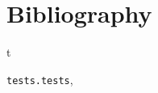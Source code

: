 \documentclass[letterpaper,10pt,english]{sphinxmanual}
\begin{document}
\chapter{Bibliography}
\label{index:bibliography}
\begin{thebibliography}{kanji98}
\end{thebibliography}


\renewcommand{\indexname}{Python Module Index}
\begin{theindex}
\def\bigletter#1{{\Large\sffamily#1}\nopagebreak\vspace{1mm}}
\bigletter{t}
\item {\texttt{tests.tests}}, \pageref{index:module-tests.tests}
\end{theindex}

\renewcommand{\indexname}{Index}
\printindex
\end{document}
